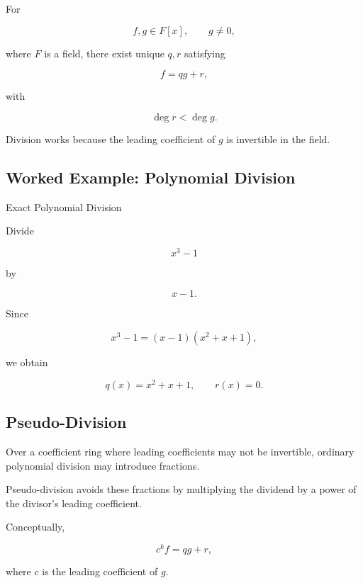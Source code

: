 For

\[
f,g\in F[x],
\qquad
g\neq0,
\]

where \(F\) is a field, there exist unique \(q,r\) satisfying

\[
\boxed{
f=qg+r,
}
\]

with

\[
\boxed{
\deg r<\deg g.
}
\]

Division works because the leading coefficient of \(g\) is invertible in
the field.

\subsection{Worked Example: Polynomial Division}
\label{subsec:worked-polynomial-division}

\begin{workedexamplebox}{Exact Polynomial Division}

Divide

\[
x^3-1
\]

by

\[
x-1.
\]

Since

\[
x^3-1
=
(x-1)(x^2+x+1),
\]

we obtain

\begin{answerbox}
\[
\boxed{
q(x)
=
x^2+x+1,
\qquad
r(x)=0.
}
\]
\end{answerbox}

\end{workedexamplebox}

\subsection{Pseudo-Division}
\label{subsec:pseudo-division}

Over a coefficient ring where leading coefficients may not be invertible,
ordinary polynomial division may introduce fractions.

Pseudo-division avoids these fractions by multiplying the dividend by a
power of the divisor's leading coefficient.

Conceptually,

\[
\boxed{
c^k f
=
qg+r,
}
\]

where \(c\) is the leading coefficient of \(g\).


